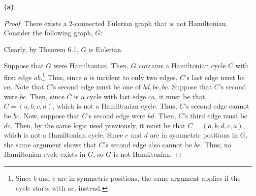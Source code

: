\documentclass[12pt]{article}
\begin{document}
{\bf (a)}
\begin{proof} There exists a 2-connected Eulerian graph that is not Hamiltonian.
	Consider the following graph, $G$:
	\begin{center}
	\end{center}

	Clearly, by Theorem 6.1, $G$ is Eulerian.

	Suppose that $G$ were Hamiltonian.
	Then, $G$ contains a Hamiltonian cycle $C$ with first edge $ab$.\footnote{Since $b$ and $c$ are in symmetric positions, the same argument applies if the cycle starts with $ac$, instead.}
	Thus, since $a$ is incident to only two edges, $C$'s last edge must be $ca$.
	Note that $C$'s second edge must be one of $bd, be, bc$.
	Suppose that $C$'s second were $bc$.
	Then, since $C$ is a cycle with last edge $ca$, it must be that $C = (a, b, c, a)$, which is not a Hamiltonian cycle.
	Thus, $C$'s second edge cannot be $bc$.
	Now, suppose that $C$'s second edge were $bd$.
	Then, $C$'s third edge must be $dc$.
	Then, by the same logic used previously, it must be that $C = (a, b, d, c, a)$, which is not a Hamiltonian cycle.
	Since $e$ and $d$ are in symmetric positions in $G$, the same argument shows that $C$'s second edge also cannot be $be$.
	Thus, no Hamiltonian cycle exists in $G$, so $G$ is not Hamiltonian.
\end{proof}
\end{document}
